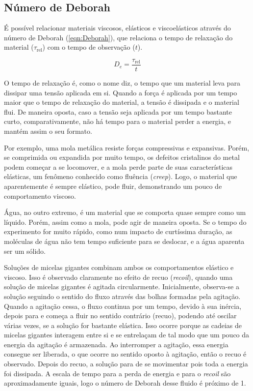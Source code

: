 		\subsection{Número de Deborah} 
		
		É possível relacionar materiais viscosos, elásticos e viscoelásticos através do número de Deborah (\autoref{eqn:Deborah})\cite{Goodwin2008}, que relaciona o tempo de relaxação do material (\(\tau_{\mathrm{rel}}\)) com o tempo de observação (\(t\)).  
		
		\begin{equation}
			D_e = \dfrac{\tau_{\text{rel}}}{t}
			\label{eqn:Deborah}
		\end{equation}
		
		O tempo de relaxação é, como o nome diz, o tempo que um material leva para dissipar uma tensão aplicada em si. Quando a força é aplicada por um tempo maior que o tempo de relaxação do material, a tensão é dissipada e o material flui. De maneira oposta, caso a tensão seja aplicada por um tempo bastante curto, comparativamente, não há tempo para o material perder a energia, e mantém assim o seu formato.
		
		Por exemplo, uma mola metálica resiste forças compressivas e expansivas. Porém, se comprimida ou expandida por muito tempo, os defeitos cristalinos do metal podem começar a se locomover, e a mola perde parte de suas características elásticas, um fenômeno conhecido como fluência (\emph{creep}). Logo, o material que aparentemente é sempre elástico, pode fluir, demonstrando um pouco de comportamento viscoso.\cite{Crossland1973, Schleichert2017}
				
		Água, no outro extremo, é um material que se comporta quase sempre como um líquido. Porém, assim como a mola, pode agir de maneira oposta. Se o tempo do experimento for muito rápido, como num impacto de curtíssima duração, as moléculas de água não tem tempo suficiente para se deslocar, e a água aparenta ser um sólido.\cite{Goodwin2008}
		
		Soluções de micelas gigantes combinam ambos os comportamentos elástico e viscoso. \cite{Pilpel1966, Hoffmann1982a}  Isso é observado claramente no efeito de recuo (\emph{recoil}),  quando uma solução de micelas gigantes é agitada circularmente.\cite{Hoffmann1988a} Inicialmente, observa-se a solução seguindo o sentido do fluxo através das bolhas formadas pela agitação. Quando a agitação cessa, o fluxo continua por um tempo, devido à sua inércia, depois para e começa a fluir no sentido contrário (recuo), podendo até oscilar várias vezes, se a solução for bastante elástica. Isso ocorre porque as cadeias de micelas gigantes interagem entre si e se entrelaçam de tal modo que um pouco da energia da agitação é armazenada. Ao interromper a agitação, essa energia consegue ser liberada, o que ocorre no sentido oposto à agitação, então o recuo é observado. Depois do recuo, a solução para de se movimentar pois toda a energia foi dissipada. A escala de tempo para a perda de energia e para o \emph{recoil} são aproximadamente iguais, logo o número de Deborah desse fluido é próximo de 1.
		
